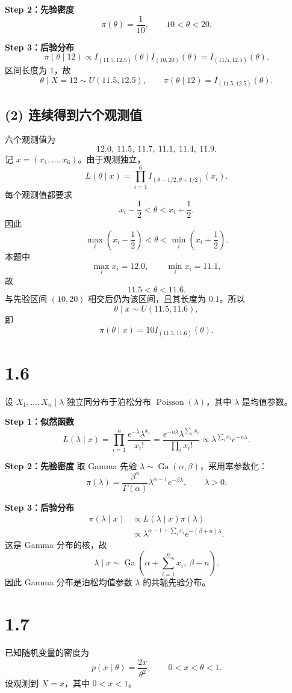 \documentclass[UTF8,zihao=-4]{ctexart}
\begin{document}
\textbf{Step 2：先验密度}
\[
\pi(\theta)=\frac1{10},\qquad10<\theta<20.
\]

\textbf{Step 3：后验分布}
\[
\pi(\theta\mid12)\propto I_{(11.5,12.5)}(\theta)I_{(10,20)}(\theta)
=I_{(11.5,12.5)}(\theta).
\]
区间长度为 \(1\)，故
\[
\boxed{\theta\mid X=12\sim U(11.5,12.5)},
\qquad
\pi(\theta\mid12)=I_{(11.5,12.5)}(\theta).
\]

\subsection*{(2) 连续得到六个观测值}
六个观测值为
\[
12.0,\ 11.5,\ 11.7,\ 11.1,\ 11.4,\ 11.9.
\]
记 \(x=(x_1,\ldots,x_6)\)。由于观测独立，
\[
L(\theta\mid x)=\prod_{i=1}^6I_{(\theta-1/2,\theta+1/2)}(x_i).
\]
每个观测值都要求
\[
x_i-\frac12<\theta<x_i+\frac12.
\]
因此
\[
\max_i\left(x_i-\frac12\right)<\theta<\min_i\left(x_i+\frac12\right).
\]
本题中
\[
\max_i x_i=12.0,\qquad\min_i x_i=11.1,
\]
故
\[
11.5<\theta<11.6.
\]
与先验区间 \((10,20)\) 相交后仍为该区间，且其长度为 \(0.1\)。所以
\[
\boxed{\theta\mid x\sim U(11.5,11.6)},
\]
即
\[
\boxed{\pi(\theta\mid x)=10I_{(11.5,11.6)}(\theta).}
\]

\section*{1.6}
设 \(X_1,\ldots,X_n\mid\lambda\) 独立同分布于泊松分布 \(\operatorname{Poisson}(\lambda)\)，其中 \(\lambda\) 是均值参数。

\textbf{Step 1：似然函数}
\[
L(\lambda\mid x)=\prod_{i=1}^n\frac{e^{-\lambda}\lambda^{x_i}}{x_i!}
=\frac{e^{-n\lambda}\lambda^{\sum_i x_i}}{\prod_i x_i!}
\propto\lambda^{\sum_i x_i}e^{-n\lambda}.
\]

\textbf{Step 2：先验密度}
取 Gamma 先验 \(\lambda\sim\operatorname{Ga}(\alpha,\beta)\)，采用率参数化：
\[
\pi(\lambda)=\frac{\beta^\alpha}{\Gamma(\alpha)}
\lambda^{\alpha-1}e^{-\beta\lambda},\qquad\lambda>0.
\]

\textbf{Step 3：后验分布}
\[
\begin{aligned}
\pi(\lambda\mid x)&\propto L(\lambda\mid x)\pi(\lambda)\\
&\propto\lambda^{\alpha-1+\sum_i x_i}e^{-(\beta+n)\lambda}.
\end{aligned}
\]
这是 Gamma 分布的核，故
\[
\boxed{\lambda\mid x\sim\operatorname{Ga}\left(\alpha+\sum_{i=1}^nx_i,\ \beta+n\right).}
\]
因此 Gamma 分布是泊松均值参数 \(\lambda\) 的共轭先验分布。

\section*{1.7}
已知随机变量的密度为
\[
p(x\mid\theta)=\frac{2x}{\theta^2},\qquad0<x<\theta<1.
\]
设观测到 \(X=x\)，其中 \(0<x<1\)。
\end{document}
